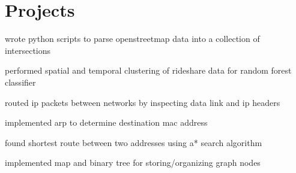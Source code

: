 \begin{minipage}[t]{0.66\textwidth}
\section{Projects}
\descript{}
\begin{tightitemize}
    \item wrote python scripts to parse openstreetmap data into a collection of intersections
    \item performed spatial and temporal clustering of rideshare data for random forest classifier
\end{tightitemize}

\descript{}
\begin{tightitemize}
    \item routed ip packets between networks by inspecting data link and ip headers 
    \item implemented arp to determine destination mac address 
\end{tightitemize}

\descript{}
\begin{tightitemize}
    \item found shortest route between two addresses using a* search algorithm
    \item implemented map and binary tree for storing/organizing graph nodes
\end{tightitemize}



\end{minipage} %
\vspace*{\fill}